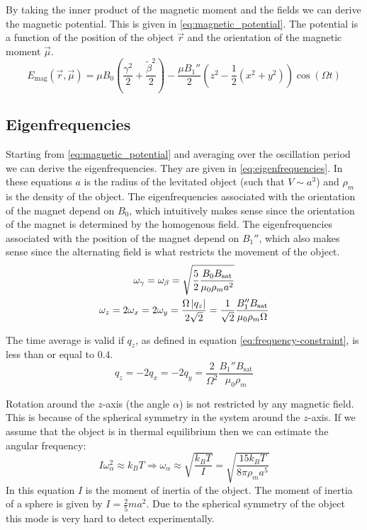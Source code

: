 By taking the inner product of the magnetic moment and the fields we can derive the magnetic potential. This is given in \autoref{eq:magnetic_potential}. The potential is a function of the position of the object $\vec{r}$ and the orientation of the magnetic moment $\vec{\mu}$\cite{perdriat}.
\begin{equation}
    E_\text{mag}(\vec{r}, \vec{\mu}) = \mu B_0 \left(\frac{\gamma^2}{2} + \frac{\tilde\beta^2}{2}\right) - \frac{\mu B_1''}{2} \left(z^2 - \frac{1}{2}\left(x^2 + y^2\right)\right)\cos(\Omega t)
    \label{eq:magnetic_potential}
\end{equation}

\subsection{Eigenfrequencies}
\label{subsec:eigenfrequencies}
Starting from \autoref{eq:magnetic_potential} and averaging over the oscillation period we can derive the eigenfrequencies\cite{perdriat}. They are given in \autoref{eq:eigenfrequencies}. In these equations $a$ is the radius of the levitated object (such that $V \sim a^3$) and $\rho_m$ is the density of the object. The eigenfrequencies associated with the orientation of the magnet depend on $B_0$, which intuitively makes sense since the orientation of the magnet is determined by the homogenous field. The eigenfrequencies associated with the position of the magnet depend on $B_1''$, which also makes sense since the alternating field is what restricts the movement of the object.
\begin{equation}
    \begin{gathered}
        \omega_\gamma = \omega_{\beta} = \sqrt{\frac{5}{2}\frac{B_0B_\text{sat}}{\mu_0 \rho_m a^2}} \\
        \omega_z = 2\omega_x = 2\omega_y = \frac{\Omega \left\lvert q_z\right\rvert}{2\sqrt{2}} = \frac{1}{\sqrt{2}}\frac{B_1''B_\text{sat}}{\mu_0\rho_m\Omega}
    \end{gathered}
    \label{eq:eigenfrequencies}
\end{equation}

The time average is valid if $q_z$, as defined in equation \ref{eq:frequency-constraint}, is less than or equal to $0.4$\cite{perdriat}.
\begin{equation}
    q_z = -2q_x = -2q_y = \frac{2}{\Omega^2}\frac{B_1''B_{\text{sat}}}{\mu_0\rho_m}
    \label{eq:frequency-constraint}
\end{equation}

Rotation around the $z$-axis (the angle $\alpha$) is not restricted by any magnetic field. This is because of the spherical symmetry in the system around the $z$-axis. If we assume that the object is in thermal equilibrium then we can estimate the angular frequency:
\begin{equation}
    I\omega_\alpha^2 \approx k_B T \Rightarrow \omega_\alpha \approx \sqrt{\frac{k_B T}{I}} = \sqrt{\frac{15 k_B T}{8 \pi \rho_m a^5}}
\end{equation}
In this equation $I$ is the moment of inertia of the object. The moment of inertia of a sphere is given by $I = \frac{2}{5} m a^2$. Due to the spherical symmetry of the object this mode is very hard to detect experimentally.

